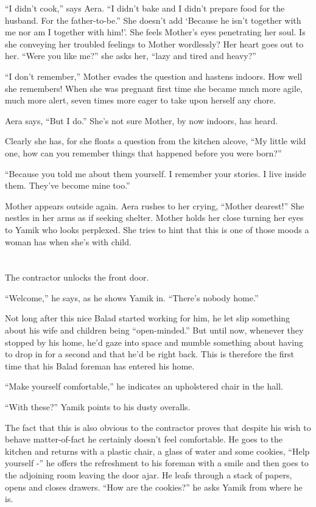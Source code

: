 \documentclass[twoside,11pt]{book}
\begin{document}
``I didn't cook,'' says Aera. ``I didn't bake and I didn't prepare food for the
husband. For the father-to-be.'' She doesn't add `Because he isn't together with me nor am I together with
him!'. She feels Mother's eyes penetrating her soul. Is she conveying her troubled feelings to Mother wordlessly? Her
heart goes out to her. ``Were you like me?'' she asks her, ``lazy and tired and heavy?''

``I don't remember,'' Mother evades the question and hastens indoors. How well she remembers!
When she was pregnant first time she became much more agile, much more alert, seven times more eager to take upon
herself any chore.

Aera says, ``But I do.'' She's not sure Mother, by now indoors, has heard.

Clearly she has, for she floats a question from the kitchen alcove, ``My little wild one, how can you
remember things that happened before you were born?''

``Because you told me about them yourself. I remember your stories. I live inside them. They've become mine
too.''

Mother appears outside again.  Aera rushes to her crying, ``Mother dearest!'' She nestles in
her arms as if seeking shelter. Mother holds her close turning her eyes to Yamik who looks perplexed. She tries to hint
that this is one of those moods a woman has when she's with child.



\chapter{}

The contractor unlocks the front door.

``Welcome,'' he says, as he shows Yamik in. ``There's nobody home.''


Not long after this nice Balad started working for him, he let slip something about his wife and children being
``open-minded.'' But until now, whenever they stopped by his home, he'd gaze into space and mumble something about
having to drop in for a second and that he'd be right back.  This is therefore the first time that his Balad foreman
has entered his home.

``Make yourself comfortable,'' he indicates an upholstered chair in the hall.

``With these?'' Yamik points to his dusty overalls.

The fact that this is also obvious to the contractor proves that despite his wish to behave matter-of-fact he certainly
doesn't feel comfortable. He goes to the kitchen and returns with a plastic chair, a glass of water and some cookies,
``Help yourself -'' he offers the refreshment to his foreman with a smile and then goes to
the adjoining room leaving the door ajar. He leafs through a stack of papers, opens and closes drawers.
``How are the cookies?'' he asks Yamik from where he is.
\end{document}
